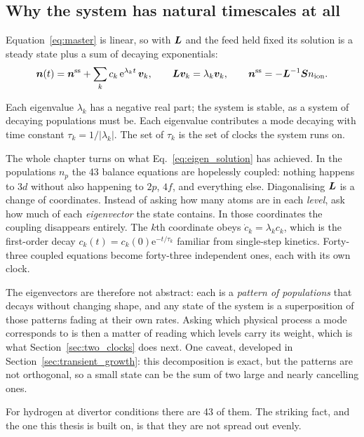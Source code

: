 \subsection{Why the system has natural timescales at all}

Equation~\eqref{eq:master} is linear, so with $\bm{L}$ and the feed held fixed its
solution is a steady state plus a sum of decaying exponentials:
\begin{equation}
  \bm{n}(t) = \bm{n}^{\mathrm{ss}}
           + \sum_{k} c_k\,\mathrm{e}^{\lambda_k t}\,\bm{v}_k,
  \qquad
  \bm{L}\bm{v}_k = \lambda_k\bm{v}_k,
  \qquad
  \bm{n}^{\mathrm{ss}} = -\bm{L}^{-1}\bm{S}n_{\mathrm{ion}}.
  \label{eq:eigen_solution}
\end{equation}

\noindent Each eigenvalue $\lambda_k$ has a negative real part; the system is
stable, as a system of decaying populations must be. Each eigenvalue contributes
a mode decaying with time constant $\tau_k = 1/|\lambda_k|$. The set of $\tau_k$
is the set of clocks the system runs on.

The whole chapter turns on what Eq.~\eqref{eq:eigen_solution} has achieved.
In the populations $n_p$ the 43 balance equations
are hopelessly coupled: nothing happens to $3d$ without also happening to $2p$,
$4f$, and everything else. Diagonalising $\bm{L}$ is a change of coordinates.
Instead of asking how many atoms are in each \emph{level}, ask how much of each
\emph{eigenvector} the state contains. In those coordinates the coupling
disappears entirely. The $k$th coordinate obeys $\dot{c}_k = \lambda_k c_k$,
which is the first-order decay $c_k(t) = c_k(0)\mathrm{e}^{-t/\tau_k}$ familiar
from single-step kinetics. Forty-three coupled equations become forty-three
independent ones, each with its own clock.

The eigenvectors are therefore not abstract: each is a \emph{pattern of
populations} that decays without changing shape, and any state of the system is
a superposition of those patterns fading at their own rates. Asking which
physical process a mode corresponds to is then a matter of reading which levels
carry its weight, which is what Section~\ref{sec:two_clocks} does next. One
caveat, developed in Section~\ref{sec:transient_growth}: this decomposition is
exact, but the patterns are not orthogonal, so a small state can be the sum of
two large and nearly cancelling ones.

For hydrogen at divertor conditions there are 43 of them. The striking fact,
and the one this thesis is built on, is that they are not spread out evenly.

